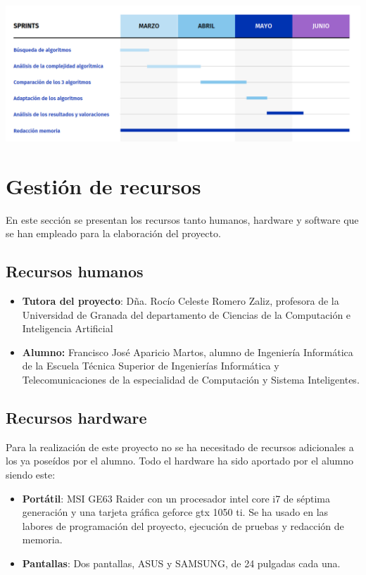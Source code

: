 \begin{center}
\includegraphics[width=1\textwidth]{imagenes/diagrama gantt.png} 
\end{center}

\section{Gestión de recursos}
En este sección se presentan los recursos tanto humanos, hardware y software que se han empleado para la elaboración del proyecto. 
\subsection{Recursos humanos}

\begin{itemize}
    \item \textbf{Tutora del proyecto}: Dña. Rocío Celeste Romero Zaliz, profesora de la Universidad de Granada del departamento de Ciencias de la Computación e Inteligencia Artificial
    \item \textbf{Alumno:} Francisco José Aparicio Martos, alumno de Ingeniería Informática de la Escuela Técnica Superior de Ingenierías Informática y Telecomunicaciones de la especialidad de Computación y Sistema Inteligentes.
\end{itemize}

\subsection{Recursos hardware}
Para la realización de este proyecto no se ha necesitado de recursos adicionales a los ya poseídos por el alumno. Todo el hardware ha sido aportado por el alumno siendo este:
\begin{itemize}
    \item \textbf{Portátil}: MSI GE63 Raider con un procesador intel core i7 de séptima generación y una tarjeta gráfica geforce gtx 1050 ti. Se ha usado en las labores de programación del proyecto, ejecución de pruebas y redacción de memoria.
    
    \item \textbf{Pantallas}: Dos pantallas, ASUS y SAMSUNG, de 24 pulgadas cada una.
\end{itemize}

